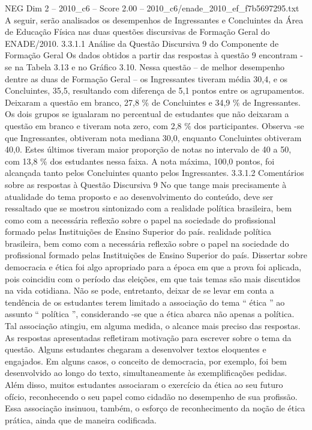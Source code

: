 \begin{textsample}{NEG Dim 2 – 2010\_c6 – Score 2.00 – 2010\_c6/enade\_2010\_ef\_f7b5697295.txt}
A seguir, serão analisados os desempenhos de Ingressantes e Concluintes da Área de Educação Física nas duas questões discursivas de Formação Geral do ENADE/2010. 3.3.1.1 Análise da Questão Discursiva 9 do Componente de Formação Geral Os dados obtidos a partir das respostas à questão 9 encontram -se na Tabela 3.13 e no Gráfico 3.10.
Nessa questão – de melhor desempenho dentre as duas de Formação Geral – os Ingressantes tiveram média 30,4, e os Concluintes, 35,5, resultando com diferença de 5,1 pontos entre os agrupamentos.
Deixaram a questão em branco, 27,8 \% de Concluintes e 34,9 \% de Ingressantes.
Os dois grupos se igualaram no percentual de estudantes que não deixaram a questão em branco e tiveram nota zero, com 2,8 \% dos participantes.
Observa -se que Ingressantes, obtiveram nota mediana 30,0, enquanto Concluintes obtiveram 40,0.
Estes últimos tiveram maior proporção de notas no intervalo de 40 a 50, com 13,8 \% dos estudantes nessa faixa.
A nota máxima, 100,0 pontos, foi alcançada tanto pelos Concluintes quanto pelos Ingressantes. 3.3.1.2 Comentários sobre as respostas à Questão Discursiva 9 No que tange mais precisamente à atualidade do tema proposto e ao desenvolvimento do conteúdo, deve ser ressaltado que se mostrou sintonizado com a realidade política brasileira, bem como com a necessária reflexão sobre o papel na sociedade do profissional formado pelas Instituições de Ensino Superior do país. realidade política brasileira, bem como com a necessária reflexão sobre o papel na sociedade do profissional formado pelas Instituições de Ensino Superior do país.
Dissertar sobre democracia e ética foi algo apropriado para a época em que a prova foi aplicada, pois coincidiu com o período das eleições, em que tais temas são mais discutidos na vida cotidiana.
Não se pode, entretanto, deixar de se levar em conta a tendência de os estudantes terem limitado a associação do tema “ ética ” ao assunto “ política ”, considerando -se que a ética abarca não apenas a política.
Tal associação atingiu, em alguma medida, o alcance mais preciso das respostas.
As respostas apresentadas refletiram motivação para escrever sobre o tema da questão.
Alguns estudantes chegaram a desenvolver textos eloquentes e engajados.
Em alguns casos, o conceito de democracia, por exemplo, foi bem desenvolvido ao longo do texto, simultaneamente às exemplificações pedidas.
Além disso, muitos estudantes associaram o exercício da ética ao seu futuro ofício, reconhecendo o seu papel como cidadão no desempenho de sua profissão.
Essa associação insinuou, também, o esforço de reconhecimento da noção de ética prática, ainda que de maneira codificada.

\end{textsample}
